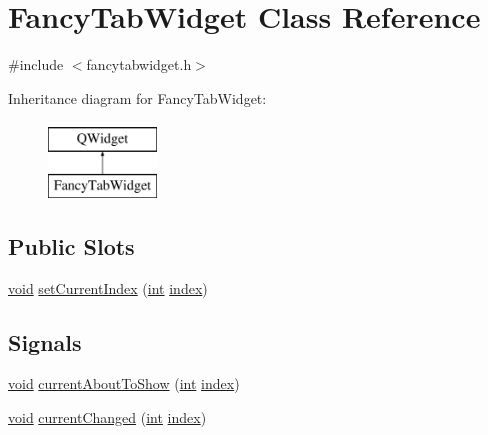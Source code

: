 \hypertarget{class_fancy_tab_widget}{\section{Fancy\-Tab\-Widget Class Reference}
\label{class_fancy_tab_widget}
}


{\ttfamily \#include $<$fancytabwidget.\-h$>$}

Inheritance diagram for Fancy\-Tab\-Widget\-:\begin{figure}[H]
\begin{center}
\leavevmode
\includegraphics[height=2.000000cm]{class_fancy_tab_widget}
\end{center}
\end{figure}
\subsection*{Public Slots}
\begin{DoxyCompactItemize}
\item 
\hyperlink{group___u_a_v_objects_plugin_ga444cf2ff3f0ecbe028adce838d373f5c}{void} \hyperlink{group___core_plugin_ga388605bdeb2516f88d2712b6cffcbc87}{set\-Current\-Index} (\hyperlink{ioapi_8h_a787fa3cf048117ba7123753c1e74fcd6}{int} \hyperlink{glext_8h_ab47dd9958bcadea08866b42bf358e95e}{index})
\end{DoxyCompactItemize}
\subsection*{Signals}
\begin{DoxyCompactItemize}
\item 
\hyperlink{group___u_a_v_objects_plugin_ga444cf2ff3f0ecbe028adce838d373f5c}{void} \hyperlink{group___core_plugin_ga7e3417f26398fa588e1cb1e5bfc41cee}{current\-About\-To\-Show} (\hyperlink{ioapi_8h_a787fa3cf048117ba7123753c1e74fcd6}{int} \hyperlink{glext_8h_ab47dd9958bcadea08866b42bf358e95e}{index})
\item 
\hyperlink{group___u_a_v_objects_plugin_ga444cf2ff3f0ecbe028adce838d373f5c}{void} \hyperlink{group___core_plugin_gac6f521b8b91c3de6a439788d129dd06f}{current\-Changed} (\hyperlink{ioapi_8h_a787fa3cf048117ba7123753c1e74fcd6}{int} \hyperlink{glext_8h_ab47dd9958bcadea08866b42bf358e95e}{index})
\end{DoxyCompactItemize}
